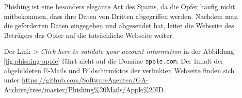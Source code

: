 Phishing ist eine besonders elegante Art des Spams, da die Opfer häufig nicht
mitbekommen, dass ihre Daten von Dritten abgegriffen werden. Nachdem man die
geforderten Daten eingegeben und abgesendet hat, leitet die Webseite des
Betrügers das Opfer auf die tatsächliche Webseite weiter.

Der Link \emph{> Click here to validate your account information} in der
Abbildung \ref{fig:phishing-apple} führt nicht auf die Domäne
\texttt{apple.com}. Der Inhalt der abgebildeten E-Mails und Bildschirmfotos der
verlinkten Webseite finden sich unter
\url{https://github.com/SoftwareAgenten/GA-Archive/tree/master/Phishing%20Mails/Apple%20ID}.
